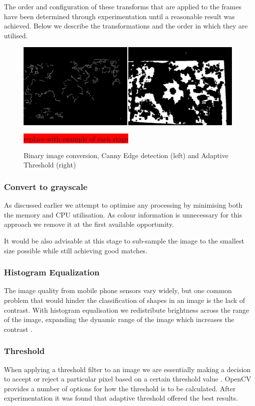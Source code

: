 The order and configuration of these transforms that are applied to the frames have been determined through experimentation until a reasonable result was achieved. Below we describe the transformations and the order in which they are utilised.

\begin{figure}
\centering
    \includegraphics[width=1.0\textwidth]{leaf_identification/images/convert_to_binary.png}
    \caption{Binary image conversion, Canny Edge detection (left) and Adaptive Threshold (right)}%
    \label{preprocessing}
    \colorbox{red}{replace with example of each stage}
\end{figure}


\subsubsection{Convert to grayscale}
As discussed earlier we attempt to optimise any processing by minimising both the memory and CPU utilisation. As colour information is unnecessary for this approach we remove it at the first available opportunity.

It would be also advisable at this stage to sub-sample the image to the smallest size possible while still achieving good matches.

\subsubsection{Histogram Equalization}
The image quality from mobile phone sensors vary widely, but one common problem that would hinder the classification of shapes in an image is the lack of contrast. With histogram equalisation we redistribute brightness across the range of the image, expanding the dynamic range of the image which increases the contrast \cite{kuntz09}.


\subsubsection{Threshold}
When applying a threshold filter to an image we are essentially making a decision to accept or reject a particular pixel based on a certain threshold value \cite{bradski08}. OpenCV provides a number of options for how the threshold is to be calculated. After experimentation it was found that adaptive threshold offered the best results.

